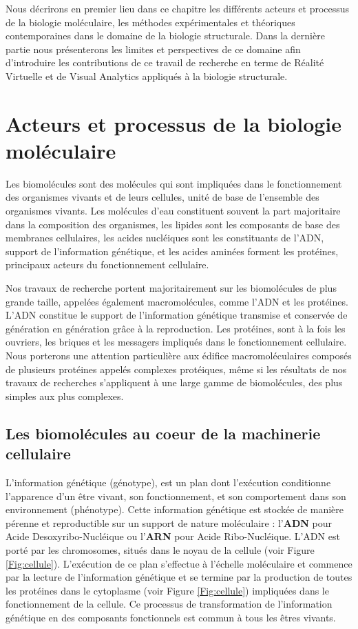 Nous décrirons en premier lieu dans ce chapitre les différents acteurs et processus de la biologie moléculaire, les méthodes expérimentales et théoriques contemporaines dans le domaine de la biologie structurale. Dans la dernière partie nous présenterons les limites et perspectives de ce domaine afin d'introduire les contributions de ce travail de recherche en terme de Réalité Virtuelle et de Visual Analytics appliqués à la biologie structurale. 

\section{Acteurs et processus de la biologie moléculaire}

Les biomolécules sont des molécules qui sont impliquées dans le fonctionnement des organismes vivants et de leurs cellules, unité de base de l’ensemble des organismes vivants. Les molécules d'eau constituent souvent la part majoritaire dans la composition des organismes, les lipides sont les composants de base des membranes cellulaires, les acides nucléiques sont les constituants de l'ADN, 
support de l'information génétique, et les acides aminées forment les protéines, principaux acteurs du fonctionnement cellulaire.

Nos travaux de recherche portent majoritairement sur les biomolécules de plus grande taille, appelées également macromolécules, comme l'ADN et les protéines. L'ADN constitue le support de l'information génétique transmise et conservée de génération en génération grâce à la reproduction. Les protéines, sont à la fois les ouvriers, les briques et les messagers impliqués dans le fonctionnement cellulaire. Nous porterons une attention particulière aux édifice macromoléculaires composés de plusieurs protéines appelés complexes protéiques, même si les résultats de nos travaux de recherches s'appliquent à une large gamme de biomolécules, des plus simples aux plus complexes.

\subsection{Les biomolécules au coeur de la machinerie cellulaire}

L'information génétique (génotype), est un plan dont l'exécution conditionne l'apparence d'un être vivant, son fonctionnement, et son comportement dans son environnement (phénotype). Cette information génétique est stockée de manière pérenne et reproductible sur un support de nature moléculaire : l'\textbf{ADN} pour Acide Desoxyribo-Nucléique ou l'\textbf{ARN} pour Acide Ribo-Nucléique. L'ADN est porté par les chromosomes, situés dans le noyau de la cellule (voir Figure \ref{Fig:cellule}).
L'exécution de ce plan s'effectue à l'échelle moléculaire et commence par la lecture de l'information génétique et se termine par la production de toutes les protéines dans le cytoplasme (voir Figure \ref{Fig:cellule}) impliquées dans le fonctionnement de la cellule. Ce processus de transformation de l'information génétique en des composants fonctionnels est commun à tous les êtres vivants.

